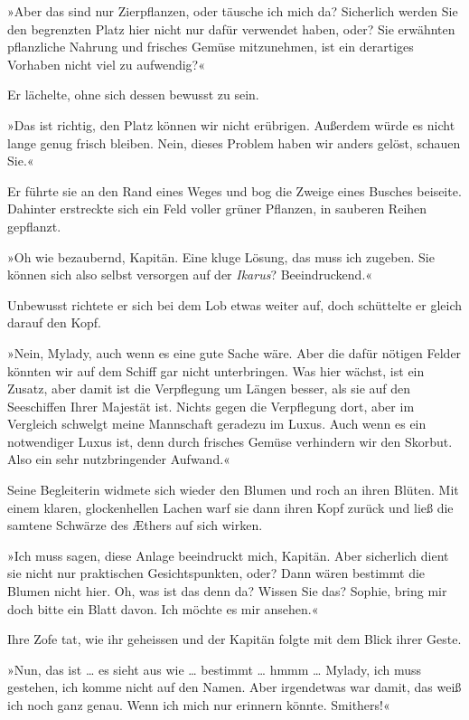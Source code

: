 »Aber das sind nur Zierpflanzen, oder täusche ich mich da?
Sicherlich werden Sie den begrenzten Platz hier nicht nur dafür
verwendet haben, oder? Sie erwähnten pflanzliche Nahrung und
frisches Gemüse mitzunehmen, ist ein derartiges Vorhaben nicht viel
zu aufwendig?«

Er lächelte, ohne sich dessen bewusst zu sein.

»Das ist richtig, den Platz können wir nicht erübrigen. Außerdem
würde es nicht lange genug frisch bleiben. Nein, dieses Problem
haben wir anders gelöst, schauen Sie.«

Er führte sie an den Rand eines Weges und bog die Zweige eines
Busches beiseite. Dahinter erstreckte sich ein Feld voller grüner
Pflanzen, in sauberen Reihen gepflanzt.

»Oh wie bezaubernd, Kapitän. Eine kluge Lösung, das muss ich
zugeben. Sie können sich also selbst versorgen auf der
\emph{Ikarus}? Beeindruckend.«

Unbewusst richtete er sich bei dem Lob etwas weiter auf, doch
schüttelte er gleich darauf den Kopf.

»Nein, Mylady, auch wenn es eine gute Sache wäre. Aber die dafür
nötigen Felder könnten wir auf dem Schiff gar nicht unterbringen.
Was hier wächst, ist ein Zusatz, aber damit ist die Verpflegung um
Längen besser, als sie auf den Seeschiffen Ihrer Majestät ist.
Nichts gegen die Verpflegung dort, aber im Vergleich schwelgt meine
Mannschaft geradezu im Luxus. Auch wenn es ein notwendiger Luxus
ist, denn durch frisches Gemüse verhindern wir den Skorbut. Also
ein sehr nutzbringender Aufwand.«

Seine Begleiterin widmete sich wieder den Blumen und roch an ihren
Blüten. Mit einem klaren, glockenhellen Lachen warf sie dann ihren
Kopf zurück und ließ die samtene Schwärze des Æthers auf sich
wirken.

»Ich muss sagen, diese Anlage beeindruckt mich, Kapitän. Aber
sicherlich dient sie nicht nur praktischen Gesichtspunkten, oder?
Dann wären bestimmt die Blumen nicht hier. Oh, was ist das denn da?
Wissen Sie das? Sophie, bring mir doch bitte ein Blatt davon. Ich
möchte es mir ansehen.«

Ihre Zofe tat, wie ihr geheissen und der Kapitän folgte mit dem
Blick ihrer Geste.

»Nun, das ist \ldots{} es sieht aus wie \ldots{} bestimmt \ldots{} hmmm \ldots{}
Mylady, ich muss gestehen, ich komme nicht auf den Namen. Aber
irgendetwas war damit, das weiß ich noch ganz genau. Wenn ich mich
nur erinnern könnte. Smithers!«

